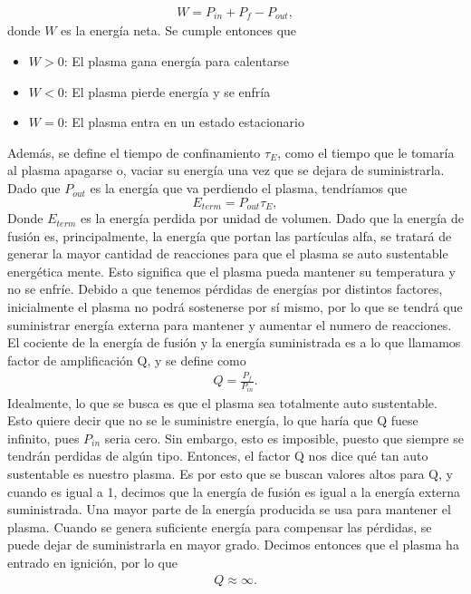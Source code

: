 \documentclass[../main.tex]{subfiles}
\begin{document}
        \begin{align}
            W = P_{in} + P_f - P_{out},
        \end{align}
        donde $W$ es la energía neta. Se cumple entonces que
        \begin{itemize}

                 \item $W > 0$: El plasma gana energía para calentarse
                 \item $W < 0$: El plasma pierde energía y se enfría
                 \item $W = 0$: El plasma entra en un estado estacionario

        \end{itemize}
        Además, se define el tiempo de confinamiento $\tau_E$, como el tiempo que le tomaría al plasma apagarse o, vaciar su energía una vez que se dejara de suministrarla. Dado que $P_{out}$ es 
        la energía que va perdiendo el plasma, tendríamos que
        \begin{equation} \label{E_term}
            E_{term} = P_{out}\tau_E,
        \end{equation}
        Donde $E_{term}$ es la energía perdida por unidad de volumen. Dado que la energía de fusión es, principalmente, la energía que portan las partículas alfa, se tratará de generar la mayor cantidad de reacciones para que el plasma se auto sustentable energética mente. Esto significa que el plasma pueda mantener su temperatura y no se enfríe. Debido a que tenemos pérdidas de energías por distintos factores, inicialmente el plasma no podrá sostenerse por sí mismo, por lo que se
        tendrá que suministrar energía externa para mantener y aumentar el numero de reacciones. El cociente de la energía de fusión y la energía 
        suministrada es a lo que llamamos factor de amplificación Q, y se define como
        \begin{align} \label{Q}
            Q = \frac{P_f}{P_{in}}.
        \end{align}
        Idealmente, lo que se busca es que el plasma sea totalmente auto sustentable. Esto quiere decir que no se le suministre energía, lo que haría que Q fuese infinito, pues $P_{in}$ seria cero. Sin embargo, esto es imposible, puesto que siempre se tendrán perdidas de algún tipo. Entonces, el factor Q nos dice qué tan auto sustentable
        es nuestro plasma. Es por esto que se buscan valores altos para Q, y cuando es igual a 1, decimos que la energía de fusión es igual a la energía externa suministrada. Una mayor parte de la energía producida
        se usa para mantener el plasma. Cuando se genera suficiente energía para compensar las pérdidas, se puede dejar de suministrarla en mayor grado. Decimos entonces que el plasma ha entrado en ignición, por lo que
        \begin{align}
            Q \approx \infty.
        \end{align}
\end{document}
